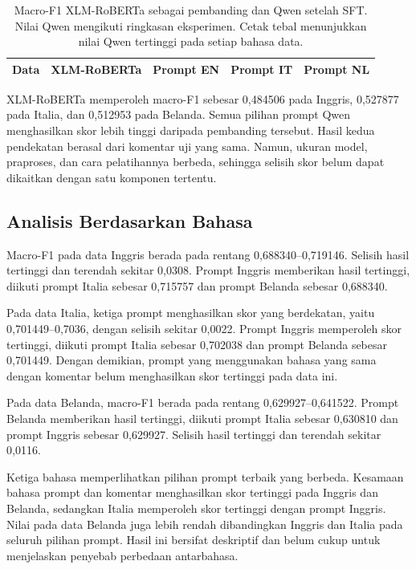 \documentclass[11pt]{article}
\begin{document}
\begin{table}[t]
\centering
\small
\setlength{\tabcolsep}{3pt}
\begin{tabular}{lrrrr}
\toprule
Data & XLM-RoBERTa & Prompt EN & Prompt IT & Prompt NL \\
\midrule

\end{tabular}
\caption{Macro-F1 XLM-RoBERTa sebagai pembanding dan Qwen setelah SFT. Nilai Qwen mengikuti ringkasan eksperimen. Cetak tebal menunjukkan nilai Qwen tertinggi pada setiap bahasa data.}
\label{tab:main}
\end{table}

XLM-RoBERTa memperoleh macro-F1 sebesar 0,484506 pada Inggris, 0,527877 pada Italia, dan 0,512953 pada Belanda. Semua pilihan prompt Qwen menghasilkan skor lebih tinggi daripada pembanding tersebut. Hasil kedua pendekatan berasal dari komentar uji yang sama. Namun, ukuran model, praproses, dan cara pelatihannya berbeda, sehingga selisih skor belum dapat dikaitkan dengan satu komponen tertentu.

\subsection{Analisis Berdasarkan Bahasa}
Macro-F1 pada data Inggris berada pada rentang 0,688340--0,719146. Selisih hasil tertinggi dan terendah sekitar 0,0308. Prompt Inggris memberikan hasil tertinggi, diikuti prompt Italia sebesar 0,715757 dan prompt Belanda sebesar 0,688340.

Pada data Italia, ketiga prompt menghasilkan skor yang berdekatan, yaitu 0,701449--0,7036, dengan selisih sekitar 0,0022. Prompt Inggris memperoleh skor tertinggi, diikuti prompt Italia sebesar 0,702038 dan prompt Belanda sebesar 0,701449. Dengan demikian, prompt yang menggunakan bahasa yang sama dengan komentar belum menghasilkan skor tertinggi pada data ini.

Pada data Belanda, macro-F1 berada pada rentang 0,629927--0,641522. Prompt Belanda memberikan hasil tertinggi, diikuti prompt Italia sebesar 0,630810 dan prompt Inggris sebesar 0,629927. Selisih hasil tertinggi dan terendah sekitar 0,0116.

Ketiga bahasa memperlihatkan pilihan prompt terbaik yang berbeda. Kesamaan bahasa prompt dan komentar menghasilkan skor tertinggi pada Inggris dan Belanda, sedangkan Italia memperoleh skor tertinggi dengan prompt Inggris. Nilai pada data Belanda juga lebih rendah dibandingkan Inggris dan Italia pada seluruh pilihan prompt. Hasil ini bersifat deskriptif dan belum cukup untuk menjelaskan penyebab perbedaan antarbahasa.
\end{document}
